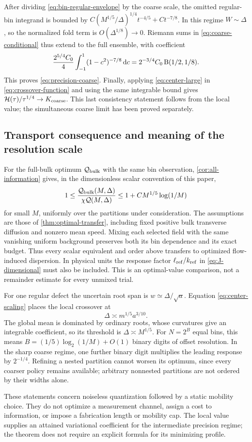 After dividing \eqref{eq:bin-regular-envelope} by the coarse
scale, the omitted regular-bin integrand is bounded by
$C(M^{1/5}/\Delta)^{1/4}t^{-4/5}+Ct^{-7/8}$.
In this regime $W\sim\Delta$, so the normalized fold term is
$O(\Delta^{1/8})\to0$. Riemann sums in
\eqref{eq:coarse-conditional} thus extend to the full ensemble,
with coefficient
\[
       \frac{2^{5/4}C_0}4\int_{-1}^1(1-c^2)^{-7/8}\,\mathrm d c
          =2^{-3/4}C_0\operatorname{B}(1/2,1/8).
\]
This proves \eqref{eq:precision-coarse}. Finally, applying
\eqref{eq:center-large} in \eqref{eq:crossover-function} and
using the same integrable bound gives
$\mathcal H(\tau)/\tau^{1/4}\to K_{\rm coarse}$.
This last consistency statement follows from the local value;
the simultaneous coarse limit has been proved separately.

\subsection{Transport consequence and meaning of the resolution scale}
For the full-bulk optimum $\mathcal Q_{\rm bulk}$ with the same
bin observation, \cref{cor:all-information} gives, in the
dimensionless scalar convention of this paper,
\begin{equation}\label{eq:precision-bulk}
 1\le\frac{\mathcal Q_{\rm bulk}(M,\Delta)}
                {\chi\mathcal Q(M,\Delta)}
       \le1+CM^{1/5}\log(1/M)
\end{equation}
for small $M$, uniformly over the partitions under consideration.
The assumptions are those of \cref{thm:optimal-transfer}, including
fixed positive bulk transverse diffusion and nonzero mean speed.
Mixing each selected field with the same vanishing uniform
background preserves both its bin dependence and its exact
budget. Thus every scalar equivalent and order above transfers
to optimized flow-induced dispersion. In physical units the
response factor $\ell_{\rm ref}/k_{\rm ref}$ in
\eqref{eq:J-dimensional} must also be included. This is an
optimal-value comparison, not a remainder estimate for every
unmixed trial.

For one regular defect the uncertain root span is
$w\simeq\Delta/\sqrt a$. Equation \eqref{eq:center-scaling}
places the local crossover at
\begin{equation}\label{eq:local-precision-threshold}
             \Delta\asymp m^{1/5}a^{3/10}.
\end{equation}
The global mean is dominated by ordinary roots, whose curvatures
give an integrable coefficient, so its threshold is
$\Delta\asymp M^{1/5}$. For $N=2^B$ equal bins, this means
$B=(1/5)\log_2(1/M)+O(1)$ binary digits of offset resolution.
In the sharp coarse regime, one further binary digit multiplies
the leading response by $2^{-1/4}$. Refining a nested partition
cannot worsen its optimum, since every coarser policy remains
available; arbitrary nonnested partitions are not ordered by
their widths alone.

These statements concern noiseless quantization followed by a
static mobility choice. They do not optimize a measurement
channel, assign a cost to information, or impose a fabrication
length or mobility cap. The local value supplies an attained
variational coefficient for the intermediate precision regime;
the theorem does not require an explicit formula for its
minimizing profile.

